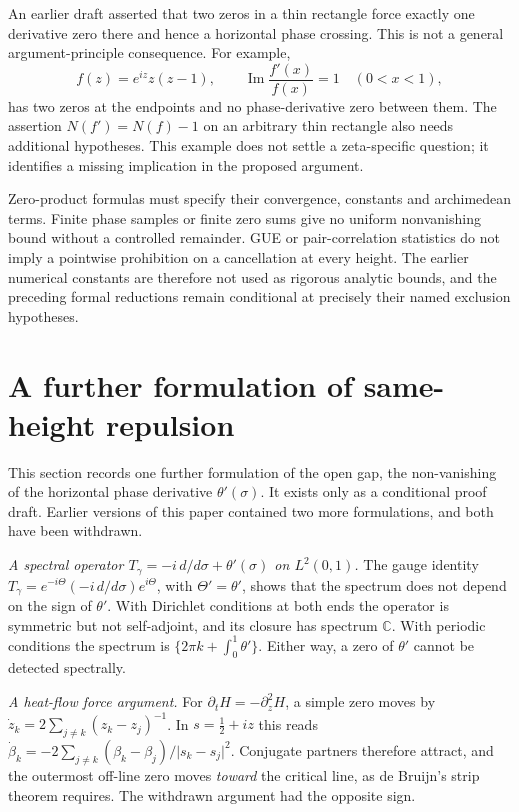 \documentclass[11pt]{amsart}
\newcommand{\im}{\operatorname{Im}}
\begin{document}
An earlier draft asserted that two zeros in a thin rectangle force exactly
one derivative zero there and hence a horizontal phase crossing. This is not
a general argument-principle consequence. For example,
\[
 f(z)=e^{iz}z(z-1),\qquad
 \im\frac{f'(x)}{f(x)}=1\quad(0<x<1),
\]
has two zeros at the endpoints and no phase-derivative zero between them.
The assertion \(N(f')=N(f)-1\) on an arbitrary thin rectangle also needs
additional hypotheses. This example does not settle a zeta-specific question;
it identifies a missing implication in the proposed argument.

Zero-product formulas must specify their convergence, constants and
archimedean terms. Finite phase samples or finite zero sums give no uniform
nonvanishing bound without a controlled remainder. GUE or pair-correlation
statistics do not imply a pointwise prohibition on a cancellation at every
height. The earlier numerical constants are therefore not used as rigorous
analytic bounds, and the preceding formal reductions remain conditional at
precisely their named exclusion hypotheses.

\section{A further formulation of same-height repulsion}

This section records one further formulation of the open gap, the non-vanishing of the horizontal phase derivative $\theta'(\sigma)$. It exists only as a conditional proof draft. Earlier versions of this paper contained two more formulations, and both have been withdrawn.

\emph{A spectral operator $T_\gamma=-i\,d/d\sigma+\theta'(\sigma)$ on $L^2(0,1)$.} The gauge identity $T_\gamma=e^{-i\Theta}(-i\,d/d\sigma)e^{i\Theta}$, with $\Theta'=\theta'$, shows that the spectrum does not depend on the sign of $\theta'$. With Dirichlet conditions at both ends the operator is symmetric but not self-adjoint, and its closure has spectrum $\mathbb C$. With periodic conditions the spectrum is $\{2\pi k+\int_0^1\theta'\}$. Either way, a zero of $\theta'$ cannot be detected spectrally.

\emph{A heat-flow force argument.} For $\partial_tH=-\partial_z^2H$, a simple zero moves by $\dot z_k=2\sum_{j\ne k}(z_k-z_j)^{-1}$. In $s=\tfrac12+iz$ this reads $\dot\beta_k=-2\sum_{j\ne k}(\beta_k-\beta_j)/\lvert s_k-s_j\rvert^2$. Conjugate partners therefore attract, and the outermost off-line zero moves \emph{toward} the critical line, as de Bruijn's strip theorem requires. The withdrawn argument had the opposite sign.
\end{document}
